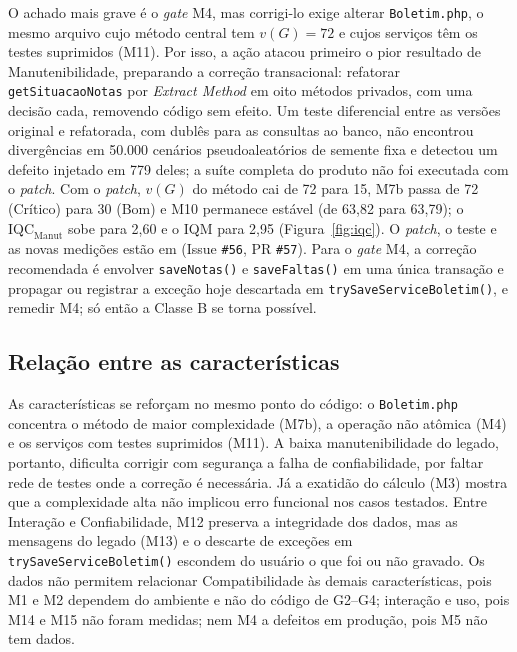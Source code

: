 \documentclass[conference]{model/IEEEtran}%
\begin{document}
O achado mais grave é o \textit{gate} M4, mas corrigi-lo exige alterar \texttt{Boletim.php}, o mesmo arquivo cujo método central tem $v(G) = 72$ e cujos serviços têm os testes suprimidos (M11). Por isso, a ação atacou primeiro o pior resultado de Manutenibilidade, preparando a correção transacional: refatorar \texttt{getSituacaoNotas} por \textit{Extract Method} em oito métodos privados, com uma decisão cada, removendo código sem efeito. Um teste diferencial entre as versões original e refatorada, com dublês para as consultas ao banco, não encontrou divergências em 50.000 cenários pseudoaleatórios de semente fixa e detectou um defeito injetado em 779 deles; a suíte completa do produto não foi executada com o \textit{patch}. Com o \textit{patch}, $v(G)$ do método cai de 72 para 15, M7b passa de 72 (Crítico) para 30 (Bom) e M10 permanece estável (de 63,82 para 63,79); o $\text{IQC}_{\text{Manut}}$ sobe para 2,60 e o IQM para 2,95 (Figura~\ref{fig:iqc}). O \textit{patch}, o teste e as novas medições estão em  (Issue \texttt{\#56}, PR \texttt{\#57}). Para o \textit{gate} M4, a correção recomendada é envolver \texttt{saveNotas()} e \texttt{saveFaltas()} em uma única transação e propagar ou registrar a exceção hoje descartada em \texttt{trySaveServiceBoletim()}, e remedir M4; só então a Classe B se torna possível.

\subsection{Relação entre as características}\label{sec:relacao}

As características se reforçam no mesmo ponto do código: o \texttt{Boletim.php} concentra o método de maior complexidade (M7b), a operação não atômica (M4) e os serviços com testes suprimidos (M11). A baixa manutenibilidade do legado, portanto, dificulta corrigir com segurança a falha de confiabilidade, por faltar rede de testes onde a correção é necessária. Já a exatidão do cálculo (M3) mostra que a complexidade alta não implicou erro funcional nos casos testados. Entre Interação e Confiabilidade, M12 preserva a integridade dos dados, mas as mensagens do legado (M13) e o descarte de exceções em \texttt{trySaveServiceBoletim()} escondem do usuário o que foi ou não gravado. Os dados não permitem relacionar Compatibilidade às demais características, pois M1 e M2 dependem do ambiente e não do código de G2--G4; interação e uso, pois M14 e M15 não foram medidas; nem M4 a defeitos em produção, pois M5 não tem dados.
\end{document}
